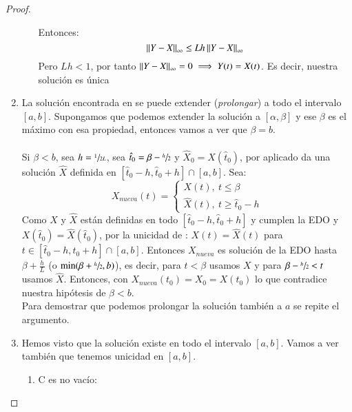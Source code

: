 \begin{proof}
\begin{enumerate}
\begin{enumerate}
        Entonces:
        $$
            \left|\left|Y-X\right|\right|_\infty \leq Lh \left|\left|Y-X\right|\right|_\infty
        $$
        Pero $Lh < 1$, por tanto $\left|\left|Y-X\right|\right|_\infty = 0 \implies Y(t) = X(t)$. Es decir, nuestra solución es única
    \end{enumerate}
        \item La solución encontrada en \label{proof:primera-parte-unic} se puede extender (\textit{prolongar}) a todo el intervalo $[a, b]$.
        Supongamos que podemos extender la solución a $[\alpha, \beta]$ y ese $\beta$ es el máximo con esa propiedad, entonces vamos a ver que $\beta = b$.\\\\
        Si $\beta < b$, sea $h = \sfrac{1}{2L}$, sea $\hat{t}_0 = \beta - \sfrac{h}{2}$ y $\hat{X}_0 = X(\hat{t}_0)$, por \label{proof:primera-parte-unic} aplicado da una solución $\hat{X}$ definida en $[\hat{t}_0 - h, \hat{t}_0 + h] \cap[a, b]$.
        Sea:
        $$
            X_{nueva}(t) =
            \begin{cases}
                X(t),\ t\leq \beta\\
                \hat{X}(t),\ t\geq \hat{t}_0 - h
        \end{cases}
        $$
        Como $X$ y $\hat{X}$ están definidas en todo $[\hat{t}_0 - h, \hat{t}_0 + h]$ y cumplen la EDO y $X(\hat{t}_0) = \hat{X}(\hat{t}_0)$, por la unicidad de  \label{proof:primera-parte-unic}: $X(t) = \hat{X}(t) $ para $t \in [\hat{t}_0 - h, \hat{t}_0 + h] \cap[a, b]$.
        Entonces $X_{nueva}$ es solución de la EDO hasta $\beta + \frac{h}{L}$ (o $\min(\beta + \sfrac{h}{2}, b)$), es decir, para $t < \beta$ usamos $X$ y para $\beta - \sfrac{h}{2} < t$ usamos $\hat{X}$. Entonces, con $X_{nueva}(t_0) = X_0 = X(t_0)$ lo que contradice nuestra hipótesis de $\beta < b$.\\
        Para demostrar que podemos prolongar la solución también a $a$ se repite el argumento.
        \item Hemos visto que la solución existe en todo el intervalo $[a, b]$. Vamos a ver también que tenemos unicidad en $[a, b]$.
        \begin{enumerate}
        \item C es no vacío:

\end{enumerate}
\end{enumerate}
\end{proof}
